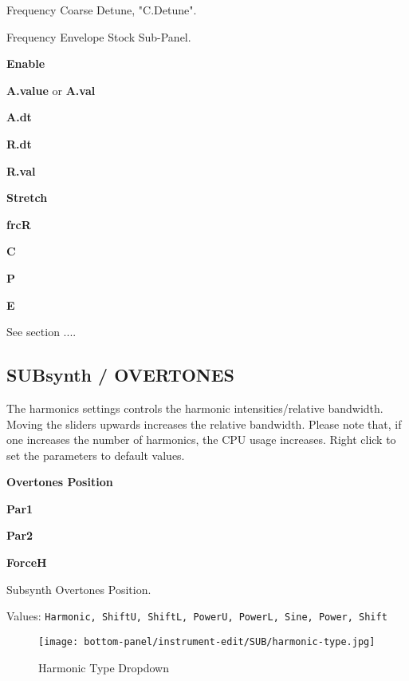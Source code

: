    Frequency Coarse Detune, "C.Detune".

   Frequency Envelope Stock Sub-Panel.

   \begin{enumber}
      \item \textbf{Enable}
      \item \textbf{A.value} or \textbf{A.val}
      \item \textbf{A.dt}
      \item \textbf{R.dt}
      \item \textbf{R.val}
      \item \textbf{Stretch}
      \item \textbf{frcR}
      \item \textbf{C}
      \item \textbf{P}
      \item \textbf{E}
   \end{enumber}

   See section ....

\subsection{SUBsynth / OVERTONES}
\label{subsec:subsynth_overtones}

The harmonics settings controls the harmonic intensities/relative bandwidth.
Moving the sliders upwards increases the relative bandwidth.  Please note
that, if one increases the number of harmonics, the CPU usage increases. Right
click to set the parameters to default values. 

   \begin{enumber}
      \item \textbf{Overtones Position}
      \item \textbf{Par1}
      \item \textbf{Par2}
      \item \textbf{ForceH}
   \end{enumber}

   \setcounter{ItemCounter}{0}      %

   Subsynth Overtones Position.

   Values: \texttt{Harmonic, ShiftU, ShiftL, PowerU, PowerL, Sine, Power, Shift}

\begin{figure}[H]
   \centering 
   \texttt{[image: bottom-panel/instrument-edit/SUB/harmonic-type.jpg]}
   \caption{Harmonic Type Dropdown}
   \label{fig:harmonic_type_dropdown}
\end{figure}

